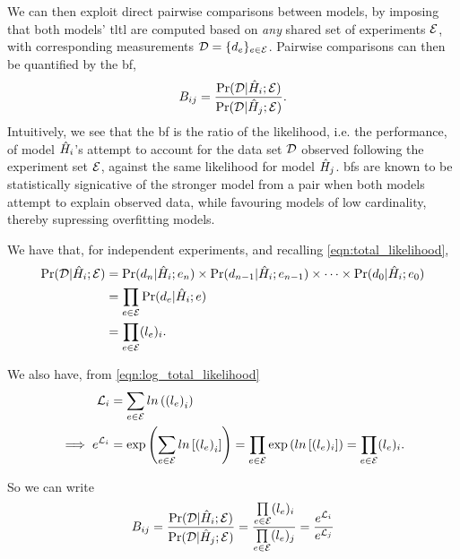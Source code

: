 We can then exploit direct pairwise comparisons between models,  
    by imposing that both models' \gls{tltl} are computed based 
    on \emph{any} shared set of \glspl{experiment} ${ \mathcal{E} }$, 
    with corresponding measurements ${ \mathcal{D} } = \{ d_{e}\}_{e \in { \mathcal{E} }}$.
Pairwise comparisons can then be quantified by the \gls{bf},
\begin{equation}
    \label{eqn:bayes_factors}
    B_{ij} = \frac{\Pr({ \mathcal{D} } | \hat{H}_i; { \mathcal{E} })}{\Pr({ \mathcal{D} } | \hat{H}_j; { \mathcal{E} })}.
\end{equation}
Intuitively, we see that the \gls{bf} is the ratio of the likelihood, i.e. the performance, 
    of model $\hat{H}_i$'s attempt to account for the data set ${ \mathcal{D} }$ observed following the 
    \gls{experiment} set ${ \mathcal{E} }$, against the same \gls{likelihood} for model $\hat{H}_j$.
\glspl{bf} are known to be statistically signicative of the stronger model 
    from a pair when both models attempt to explain observed data,
    while favouring models of low cardinality, thereby supressing overfitting models. 
\par 

We have that, for independent \glspl{experiment}, and recalling \cref{eqn:total_likelihood}, 
\begin{align}
    \begin{split}
        \Pr({ \mathcal{D} } | \hat{H}_i; { \mathcal{E} }) &= \Pr(d_n | \hat{H}_i; e_n) \times \Pr(d_{n-1} | \hat{H}_i; e_{n-1}) \times \dots \times \Pr(d_0 | \hat{H}_i; e_0) \\
        &= \prod_{e \in { \mathcal{E} }} \Pr(d_e | \hat{H}_i; e) \\
        &= \prod_{e \in { \mathcal{E} }} (l_{e})_i.
    \end{split}
\end{align}

We also have, from \cref{eqn:log_total_likelihood}
\begin{align}
    \label{eqn:log_likelihood}
    \begin{split}
        {\mathcal{L}}_{i} &= \sum_{e \in { \mathcal{E} }} ln\left(\left(l_{e}\right)_i\right) \\
        \implies e^{{\mathcal{L}}_{i}} &= \exp \left( \sum_{e \in { \mathcal{E} }} ln \left[ \left(l_{e}\right)_i\right] \right) 
        = \prod_{e \in { \mathcal{E} }} \exp \left( ln \left[ (l_{e})_i \right]  \right) 
        = \prod_{e \in { \mathcal{E} }} (l_{e})_i.
    \end{split}
\end{align}

So we can write 
\begin{align}
    \label{eqn:bf_by_ll}
    \begin{split}
        B_{ij} &= \frac{\Pr({ \mathcal{D} } | \hat{H}_i; { \mathcal{E} })}{\Pr({ \mathcal{D} } | \hat{H}_j; { \mathcal{E} })} 
        = \frac{ \prod\limits_{e \in { \mathcal{E} }} (l_{e})_i } {\prod\limits_{e \in { \mathcal{E} }} (l_{e})_j } 
        = \frac{e^{{\mathcal{L}}_{i}}}{e^{{\mathcal{L}}_{j}}} \\
    \end{split}
\end{align}

